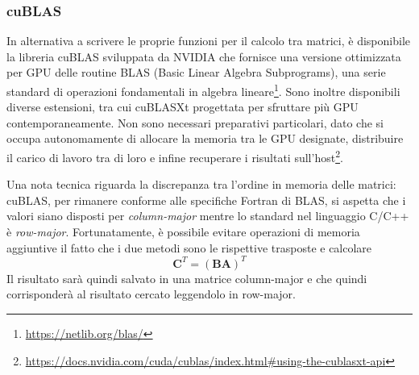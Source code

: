 \documentclass[a4paper]{article}
\begin{document}
\subsubsection{cuBLAS}
In alternativa a scrivere le proprie funzioni per il calcolo tra matrici, è disponibile la libreria cuBLAS sviluppata da NVIDIA che fornisce una versione ottimizzata per GPU delle routine BLAS (Basic Linear Algebra Subprograms), una serie standard di operazioni fondamentali in algebra lineare\footnote{\url{https://netlib.org/blas/}}. Sono inoltre disponibili diverse estensioni, tra cui cuBLASXt progettata per sfruttare più GPU contemporaneamente. Non sono necessari preparativi particolari, dato che si occupa autonomamente di allocare la memoria tra le GPU designate, distribuire il carico di lavoro tra di loro e infine recuperare i risultati sull'host\footnote{\url{https://docs.nvidia.com/cuda/cublas/index.html\#using-the-cublasxt-api}}.

Una nota tecnica riguarda la discrepanza tra l'ordine in memoria delle matrici: cuBLAS, per rimanere conforme alle specifiche Fortran di BLAS, si aspetta che i valori siano disposti per \textit{column-major} mentre lo standard nel linguaggio C/C++ è \textit{row-major}. Fortunatamente, è possibile evitare operazioni di memoria aggiuntive il fatto che i due metodi sono le rispettive trasposte e calcolare
$$
    \mathbf{C}^T=(\mathbf{B}\mathbf{A})^T
$$
Il risultato sarà quindi salvato in una matrice column-major e che quindi corrisponderà al risultato cercato leggendolo in row-major.




\begingroup
\let\clearpage\relax

\endgroup

\printbibliography
\end{document}
